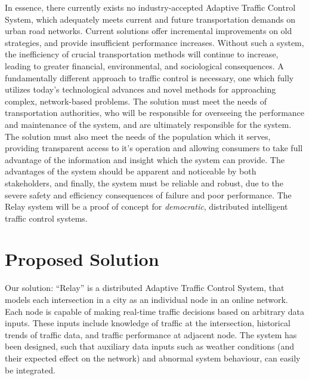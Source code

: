 \documentclass{report}
\begin{document}
In essence, there currently exists no industry-accepted Adaptive Traffic Control System, which adequately meets current and future transportation demands on urban road networks.
Current solutions offer incremental improvements on old strategies, and provide insufficient performance increases.
Without such a system, the inefficiency of crucial transportation methods will continue to increase, leading to greater financial, environmental, and sociological consequences.
A fundamentally different approach to traffic control is necessary, one which fully utilizes today's technological advances and novel methods for approaching complex, network-based problems.
The solution must meet the needs of transportation authorities, who will be responsible for overseeing the performance and maintenance of the system, and are ultimately responsible for the system.
The solution must also meet the needs of the population which it serves, providing transparent access to it's operation and allowing consumers to take full advantage of the information and insight which the system can provide.
The advantages of the system should be apparent and noticeable by both stakeholders, and finally, the system must be reliable and robust, due to the severe safety and efficiency consequences of failure and poor performance. The Relay system will be a proof of concept for \emph{democratic}, distributed intelligent traffic control systems.\\

\section{Proposed Solution}
Our solution: ``Relay'' is a distributed Adaptive Traffic Control System, that models each intersection in a city as an individual node in an online network.
Each node is capable of making real-time traffic decisions based on arbitrary data inputs.
These inputs include knowledge of traffic at the intersection, historical trends of traffic data, and traffic performance at adjacent node. The system has been designed, such that auxiliary data inputs such as weather conditions (and their expected effect on the network) and abnormal system behaviour, can easily be integrated.\\
\end{document}
